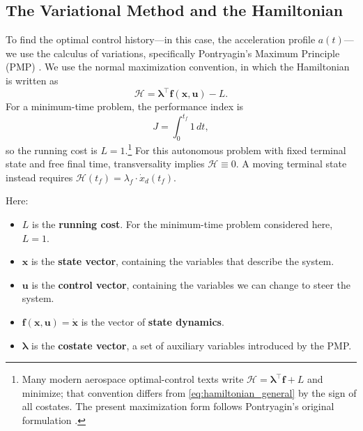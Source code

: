 \documentclass[journal,a4paper]{IEEEtran}
\begin{document}
\subsection{The Variational Method and the Hamiltonian}
\label{sec:pmp_theory}
To find the optimal control history---in this case, the acceleration profile \(a(t)\)---we use the calculus of variations, specifically Pontryagin's Maximum Principle (PMP) \cite{Pontryagin1962}. We use the normal maximization convention, in which the Hamiltonian is written as
\begin{equation}
    \mathcal{H}
    =
    \boldsymbol{\lambda}^\top \mathbf{f}(\mathbf{x},\mathbf{u}) - L .
    \label{eq:hamiltonian_general}
\end{equation}
For a minimum-time problem, the performance index is
\[
    J=\int_0^{t_f} 1\,dt,
\]
so the running cost is \(L=1\).\footnote{Many modern aerospace optimal-control texts write \(\mathcal{H}=\boldsymbol{\lambda}^\top\mathbf{f}+L\) and minimize; that convention differs from \eqref{eq:hamiltonian_general} by the sign of all costates. The present maximization form follows Pontryagin's original formulation \cite{Pontryagin1962}.} For this autonomous problem with fixed terminal state and free final time, transversality implies \(\mathcal{H}\equiv 0\). A moving terminal state instead requires \(\mathcal H(t_f)=\lambda_f\cdot\dot x_d(t_f)\).

Here:
\begin{itemize}
    \item \(L\) is the \textbf{running cost}. For the minimum-time problem considered here, \(L=1\).
    \item \(\mathbf{x}\) is the \textbf{state vector}, containing the variables that describe the system.
    \item \(\mathbf{u}\) is the \textbf{control vector}, containing the variables we can change to steer the system.
    \item \(\mathbf{f}(\mathbf{x}, \mathbf{u}) = \dot{\mathbf{x}}\) is the vector of \textbf{state dynamics}.
    \item \(\boldsymbol{\lambda}\) is the \textbf{costate vector}, a set of auxiliary variables introduced by the PMP.
\end{itemize}
\end{document}

